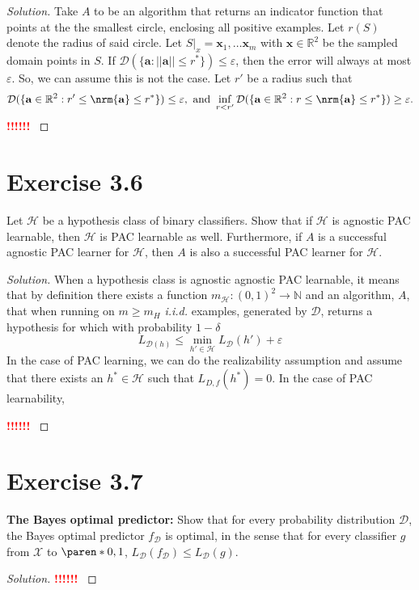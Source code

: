 \documentclass[10pt, a4paper, twoside]{amsart}
\newcommand{\N}{\ensuremath{\mathbb{N}}}
\newcommand{\R}{\ensuremath{\mathbb{R}}}
\DeclarePairedDelimiter\paren()
\DeclarePairedDelimiter{\nrm}\lVert\rVert
\newenvironment{solution}
               {\let\oldqedsymbol=\qedsymbol
                \renewcommand{\qedsymbol}{$\blacktriangleleft$}
                \begin{proof}[Solution]}
               {\end{proof}
                \renewcommand{\qedsymbol}{\oldqedsymbol}}
\newcommand{\TODO}{\textcolor{red}{\textbf{!!!!!! }}}
\begin{document}
\begin{solution}
  Take $A$ to be an algorithm that returns an indicator function that points at the the smallest circle, enclosing all positive examples. Let $r(S)$ denote the radius of said circle.
  Let $S|_x  = \mathbf{x}_1,\ldots \mathbf{x}_m$ with $\mathbf{x} \in \R^2$ be the sampled domain points in $S$. 
  If $\mathcal{D}(\{\mathbf{a}:||\mathbf{a}||\leq r^{*}\}) \leq \varepsilon $, 
  then the error will always at most $\varepsilon$.
  So, we can assume this is not the case.
  Let $r'$ be a radius such that
  \begin{equation*}
    \mathcal{D}(\{\mathbf{a} \in \R^2 : r' \leq \nrm{\mathbf{a}} \leq r^*\}) \leq \varepsilon, \text{ and }
    \inf_{r<r'}\mathcal{D}(\{\mathbf{a} \in \R^2 : r \leq \nrm{\mathbf{a}} \leq r^*\}) \geq \varepsilon.
  \end{equation*}
  \TODO
  
\end{solution}


\section*{Exercise 3.6}
Let $\mathcal{H}$ be a hypothesis class of binary classifiers. Show that if $\mathcal{H}$ is agnostic PAC learnable, then $\mathcal{H}$ is PAC learnable as well.
Furthermore, if $A$ is a successful agnostic PAC learner for $\mathcal{H}$, then $A$ is also a successful PAC learner for $\mathcal{H}$.
\begin{solution}
  When a hypothesis class is agnostic agnostic  PAC learnable, it means that by definition there exists a function $m_{\mathcal{H}}:(0,1)^2\to \N$ and an algorithm, $A$, that when running on $m\geq m_{H}$ \textit{i.i.d.} examples, generated by $\mathcal{D}$, returns a hypothesis for which
  with probability $1-\delta$
  \begin{equation*}
    L_{\mathcal{D}(h)} \leq \min_{h' \in \mathcal{H}}L_{\mathcal{D}}(h')+\varepsilon
  \end{equation*}
In the case of PAC learning, we can do the realizability assumption and assume that there exists an $h^* \in \mathcal{H}$ such that $L_{D,f}(h^*) = 0$. In the case of PAC learnability, 
  
    
  \TODO
\end{solution}


\section*{Exercise 3.7}
\textbf{The Bayes optimal predictor:} Show that for every probability distribution $\mathcal{D}$, the Bayes optimal predictor $f_{\mathcal{D}}$ is optimal, in the sense that for every classifier $g$ from $\mathcal{X}$ to $\paren*{0,1}$, $L_{\mathcal{D}}(f_{\mathcal{D}}) \leq L_{\mathcal{D}}(g)$.
\begin{solution}
  \TODO
\end{solution}
\end{document}

